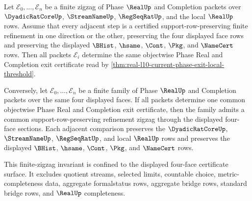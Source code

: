 \begin{theorem}
\label{thm:real-l10-exit-certificate-refinement-zigzag}
Let $\mathcal E_0,\ldots,\mathcal E_n$ be a finite zigzag of Phase $\RealUp$ and Completion packets over $\DyadicRatCoreUp$, $\StreamNameUp$, $\RegSeqRatUp$, and the local $\RealUp$ rows. Assume that every adjacent step is a certified support-row-preserving finite refinement in one direction or the other, preserving the four displayed face rows and preserving the displayed $\BHist$, $\hsame$, $\Cont$, $\Pkg$, and $\NameCert$ rows. Then all packets $\mathcal E_i$ determine the same objectwise Phase Real and Completion exit certificate read by \autoref{thm:real-l10-current-phase-exit-local-threshold}.

Conversely, let $\mathcal E_0,\ldots,\mathcal E_n$ be a finite family of Phase $\RealUp$ and Completion packets over the same four displayed faces. If all packets determine one common objectwise Phase Real and Completion exit certificate, then the family admits a common support-row-preserving refinement zigzag through the displayed four-face sections. Each adjacent comparison preserves the $\DyadicRatCoreUp$, $\StreamNameUp$, $\RegSeqRatUp$, and local $\RealUp$ rows and preserves the displayed $\BHist$, $\hsame$, $\Cont$, $\Pkg$, and $\NameCert$ rows.

This finite-zigzag invariant is confined to the displayed four-face certificate surface. It excludes quotient streams, selected limits, countable choice, metric-completeness data, aggregate formalstatus rows, aggregate bridge rows, standard bridge rows, and $\RealUp$ completeness.
\end{theorem}
